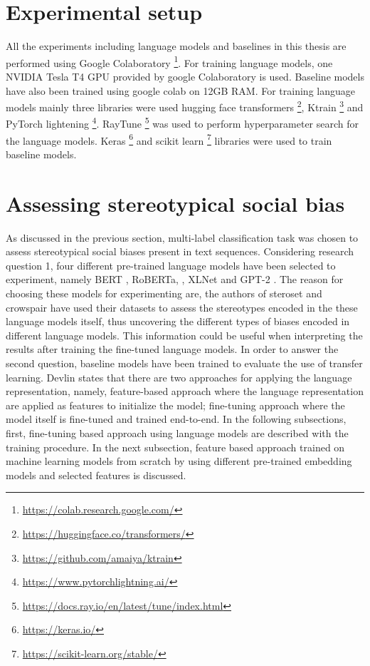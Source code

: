 \section{Experimental setup}
\label{experimental_setup}
All the experiments including language models and baselines in this thesis are performed using Google Colaboratory \footnote{\url{https://colab.research.google.com/}}. For training language models, one NVIDIA Tesla T4 GPU provided by google Colaboratory is used. Baseline models have also been trained using google colab on 12GB RAM. For training language models mainly three libraries were used hugging face transformers \footnote{\url{https://huggingface.co/transformers/}}, Ktrain \footnote{\url{https://github.com/amaiya/ktrain}} and PyTorch lightening \footnote{\url{https://www.pytorchlightning.ai/}}. RayTune \footnote{\url{https://docs.ray.io/en/latest/tune/index.html}} was used to perform hyperparameter search for the language models. Keras \footnote{\url{https://keras.io/}} and scikit learn \footnote{\url{https://scikit-learn.org/stable/}} libraries were used to train baseline models.

\section{Assessing stereotypical social bias} \label{assessing_social_biases}
As discussed in the previous section, multi-label classification task was chosen to assess stereotypical social biases present in text sequences. Considering research question 1, four different pre-trained language models have been selected to experiment, namely BERT \cite{devlin2018bert}, RoBERTa, \cite{liu2019roberta}, XLNet \cite{yang2019xlnet} and GPT-2  \cite{radford2019language}. The reason for choosing these models for experimenting are, the authors of steroset \cite{nadeem2020stereoset} and crowspair \cite{nangia2020crows} have used their datasets to assess the stereotypes encoded in the these language models itself, thus uncovering the different types of biases encoded in different language models. This information could be useful when interpreting the results after training the fine-tuned language models. In order to answer the second question, baseline models have been trained to evaluate the use of transfer learning. Devlin\cite{devlin2018bert} states that there are two approaches for applying the language representation, namely, feature-based approach where the language representation are applied as features to initialize the model; fine-tuning approach where the model itself is fine-tuned and trained end-to-end. In the following subsections, first, fine-tuning based approach using language models are described with the training procedure. In the next subsection, feature based approach trained on machine learning models from scratch by using different pre-trained embedding models and selected features is discussed. 
